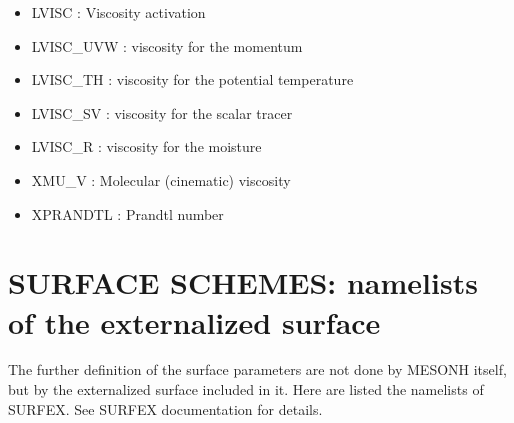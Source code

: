 \begin{itemize}
\item   {}
LVISC : Viscosity activation

\item   {}
LVISC\_UVW : viscosity for the momentum

\item   {}
LVISC\_TH : viscosity for the potential temperature

\item   {}
LVISC\_SV : viscosity for the scalar tracer

\item   {}
LVISC\_R : viscosity for the moisture
 
\item   {}
XMU\_V : Molecular (cinematic) viscosity

\item   {}
XPRANDTL : Prandtl number

\end{itemize}

\section{SURFACE SCHEMES: namelists of the externalized surface}
\label{ss:surf}

The further definition of the surface parameters are not done by MESONH itself, but by the externalized surface included in it. 
Here are listed the namelists of SURFEX. See SURFEX documentation for details.

